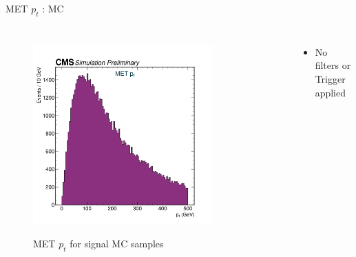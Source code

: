 \documentclass[10pt,xcolor=dvipsnames,aspectratio=169]{beamer}
\begin{document}
    
   \begin{frame}[fragile]{MET $p_t$ : MC} 
    \begin{columns}
    \begin{figure} 
    \centering 
     \includegraphics[width=0.8\textwidth]{../Archive/KinemPlots/METMC.png }
    \label{METMC} 
    \caption{MET $p_t$ for signal MC samples}
    \end{figure} 
    \begin{itemize} 
    \raggedright 
    \small
    \item No filters or Trigger applied
    \end{itemize}
    \end{columns} 
    \end{frame} 
    
\end{document}
